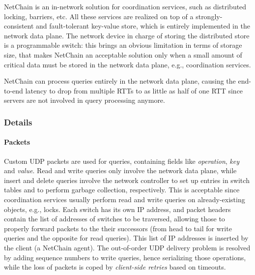 NetChain \cite{netchain} is an in-network solution for coordination services, such as distributed locking, barriers, etc.
All these services are realized on top of a strongly-consistent and fault-tolerant key-value store, which is entirely implemented in the network data plane.
The network device in charge of storing the distributed store is a programmable switch: this brings an obvious limitation in terms of storage size, that makes NetChain \cite{netchain} an acceptable solution only when a small amount of critical data must be stored in the network data plane, e.g., coordination services.\par
NetChain \cite{netchain} can process queries entirely in the network data plane, causing the end-to-end latency to drop from multiple RTTs to as little as half of one RTT since servers are not involved in query processing anymore.

\subsubsection{Details}
\paragraph{Packets}
Custom UDP packets are used for queries, containing fields like \textit{operation}, \textit{key} and \textit{value}.
Read and write queries only involve the network data plane, while insert and delete queries involve the network controller to set up entries in switch tables and to perform garbage collection, respectively.
This is acceptable since coordination services usually perform read and write queries on already-existing objects, e.g., locks.
Each switch has its own IP address, and packet headers contain the list of addresses of switches to be traversed, allowing those to properly forward packets to the their successors (from head to tail for write queries and the opposite for read queries).
This list of IP addresses is inserted by the client (a NetChain \cite{netchain} agent).
The out-of-order UDP delivery problem is resolved by adding sequence numbers to write queries, hence serializing those operations, while the loss of packets is coped by \textit{client-side retries} based on timeouts.
